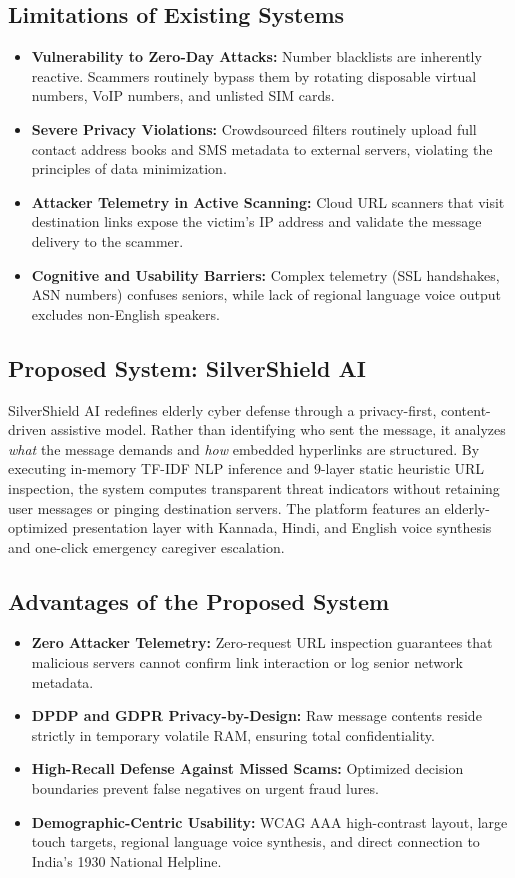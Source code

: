 \documentclass[conference]{IEEEtran}
\begin{document}
\subsection{Limitations of Existing Systems}
\begin{itemize}
    \item \textbf{Vulnerability to Zero-Day Attacks:} Number blacklists are inherently reactive. Scammers routinely bypass them by rotating disposable virtual numbers, VoIP numbers, and unlisted SIM cards.
    \item \textbf{Severe Privacy Violations:} Crowdsourced filters routinely upload full contact address books and SMS metadata to external servers, violating the principles of data minimization.
    \item \textbf{Attacker Telemetry in Active Scanning:} Cloud URL scanners that visit destination links expose the victim's IP address and validate the message delivery to the scammer.
    \item \textbf{Cognitive and Usability Barriers:} Complex telemetry (SSL handshakes, ASN numbers) confuses seniors, while lack of regional language voice output excludes non-English speakers.
\end{itemize}

\subsection{Proposed System: SilverShield AI}
SilverShield AI redefines elderly cyber defense through a privacy-first, content-driven assistive model. Rather than identifying who sent the message, it analyzes \textit{what} the message demands and \textit{how} embedded hyperlinks are structured. By executing in-memory TF-IDF NLP inference and 9-layer static heuristic URL inspection, the system computes transparent threat indicators without retaining user messages or pinging destination servers. The platform features an elderly-optimized presentation layer with Kannada, Hindi, and English voice synthesis and one-click emergency caregiver escalation.

\subsection{Advantages of the Proposed System}
\begin{itemize}
    \item \textbf{Zero Attacker Telemetry:} Zero-request URL inspection guarantees that malicious servers cannot confirm link interaction or log senior network metadata.
    \item \textbf{DPDP and GDPR Privacy-by-Design:} Raw message contents reside strictly in temporary volatile RAM, ensuring total confidentiality.
    \item \textbf{High-Recall Defense Against Missed Scams:} Optimized decision boundaries prevent false negatives on urgent fraud lures.
    \item \textbf{Demographic-Centric Usability:} WCAG AAA high-contrast layout, large touch targets, regional language voice synthesis, and direct connection to India's 1930 National Helpline.
\end{itemize}
\end{document}

